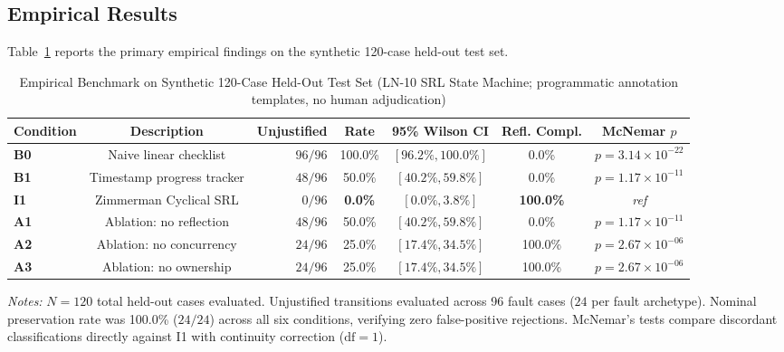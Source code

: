 \documentclass[11pt,a4paper]{article}
\begin{document}
\subsection{Empirical Results}
Table~\ref{tab:holdout-results} reports the primary empirical findings on the synthetic 120-case held-out test set.

\begin{table}[htbp]
\centering
\small
\caption{Empirical Benchmark on Synthetic 120-Case Held-Out Test Set (LN-10 SRL State Machine; programmatic annotation templates, no human adjudication)}
\label{tab:holdout-results}
\begin{tabular}{lcrcccc}
\toprule
\textbf{Condition} & \textbf{Description} & \textbf{Unjustified} & \textbf{Rate} & \textbf{95\% Wilson CI} & \textbf{Refl. Compl.} & \textbf{McNemar $p$} \\
\midrule
\textbf{B0} & Naive linear checklist & $96 / 96$ & 100.0\% & $[96.2\%, 100.0\%]$ & 0.0\% & $p = 3.14 \times 10^{-22}$ \\
\textbf{B1} & Timestamp progress tracker & $48 / 96$ & 50.0\% & $[40.2\%, 59.8\%]$ & 0.0\% & $p = 1.17 \times 10^{-11}$ \\
\textbf{I1} & Zimmerman Cyclical SRL & $0 / 96$ & \textbf{0.0\%} & $[\mathbf{0.0\%}, \mathbf{3.8\%}]$ & \textbf{100.0\%} & \textit{ref} \\
\textbf{A1} & Ablation: no reflection & $48 / 96$ & 50.0\% & $[40.2\%, 59.8\%]$ & 0.0\% & $p = 1.17 \times 10^{-11}$ \\
\textbf{A2} & Ablation: no concurrency & $24 / 96$ & 25.0\% & $[17.4\%, 34.5\%]$ & 100.0\% & $p = 2.67 \times 10^{-06}$ \\
\textbf{A3} & Ablation: no ownership & $24 / 96$ & 25.0\% & $[17.4\%, 34.5\%]$ & 100.0\% & $p = 2.67 \times 10^{-06}$ \\
\bottomrule
\end{tabular}
\par\smallskip
\begin{minipage}{0.98\linewidth}\footnotesize
\textit{Notes:} $N=120$ total held-out cases evaluated. Unjustified transitions evaluated across 96 fault cases ($24$ per fault archetype). Nominal preservation rate was 100.0\% ($24/24$) across all six conditions, verifying zero false-positive rejections. McNemar's tests compare discordant classifications directly against I1 with continuity correction ($\text{df}=1$).
\end{minipage}
\end{table}
\end{document}
